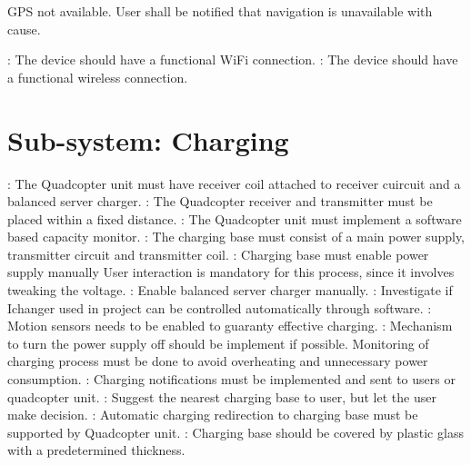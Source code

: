 \documentclass[a4paper]{article}
\begin{document}
 GPS not available.
 User shall be notified that navigation is unavailable with cause.


: The device should have a functional WiFi connection.
: The device should have a functional wireless connection.

\section{Sub-system: Charging}

: The Quadcopter unit must have receiver coil attached to receiver cuircuit and a balanced server charger.
: The Quadcopter receiver and transmitter must be placed within a fixed distance.
: The Quadcopter unit must implement a software based capacity monitor.
: The charging base must consist of a main power supply, transmitter circuit and transmitter coil.
: Charging base must enable power supply manually User interaction is mandatory for this process, since it involves tweaking the voltage.
: Enable balanced server charger manually.
: Investigate if Ichanger used in project can be controlled automatically  through software.
: Motion sensors needs to be enabled to guaranty effective charging.
: Mechanism to turn the power supply off should be implement if possible. Monitoring of charging process must be done to avoid overheating and unnecessary  power consumption.
: Charging notifications must be implemented and sent to users or quadcopter unit.
: Suggest the nearest charging base to user, but let the user make decision.
: Automatic charging redirection to charging base must be supported by Quadcopter unit.
: Charging base should be covered by plastic glass with a predetermined thickness.
\end{document}

